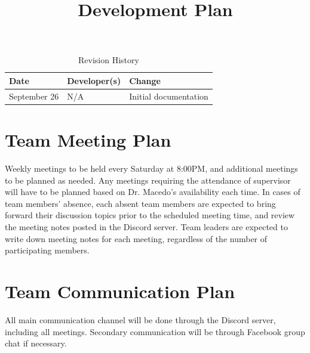 \documentclass{article}
\title{Development Plan\\\progname}
\author{\authname}
\date{}
\begin{document}
\begin{table}[hp]
\caption{Revision History} \label{TblRevisionHistory}
\begin{tabularx}{\textwidth}{llX}
\toprule
\textbf{Date} & \textbf{Developer(s)} & \textbf{Change}\\
\midrule
September 26 & N/A & Initial documentation\\
\bottomrule
\end{tabularx}
\end{table}

\newpage

\maketitle


\section{Team Meeting Plan}
Weekly meetings to be held every Saturday at 8:00PM, and additional meetings to be planned as needed. Any meetings requiring the attendance of supervisor will have to be planned based on Dr. Macedo's availability each time. In cases of team members' absence, each absent team members are expected to bring forward their discussion topics prior to the scheduled meeting time, and review the meeting notes posted in the Discord server. Team leaders are expected to write down meeting notes for each meeting, regardless of the number of participating members.\\

\section{Team Communication Plan}
All main communication channel will be done through the Discord server, including all meetings. Secondary communication will be through Facebook group chat if necessary.\\
\end{document}
